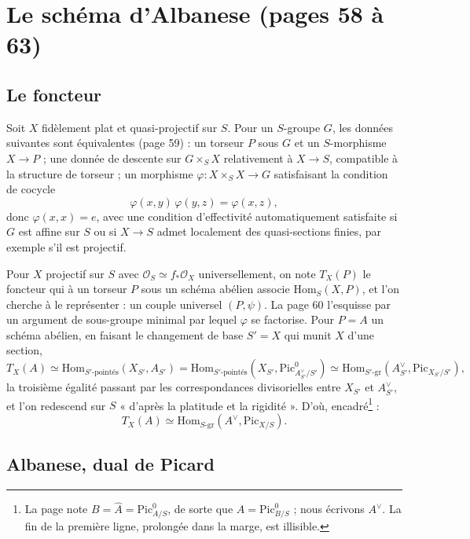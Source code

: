 \documentclass[11pt,a4paper]{article}
\begin{document}
\section*{Le schéma d'Albanese (pages 58 à 63)}

\subsection*{Le foncteur}

Soit $X$ fidèlement plat et quasi-projectif sur $S$. Pour un $S$-groupe $G$,
les données suivantes sont équivalentes (page 59) : un torseur $P$ sous $G$ et
un $S$-morphisme $X \to P$ ; une donnée de descente sur $G \times_S X$
relativement à $X \to S$, compatible à la structure de torseur ; un morphisme
$\varphi \colon X \times_S X \to G$ satisfaisant la condition de cocycle
\[
\varphi(x, y)\,\varphi(y, z) = \varphi(x, z) ,
\]
donc $\varphi(x, x) = e$, avec une condition d'effectivité automatiquement
satisfaite si $G$ est affine sur $S$ ou si $X \to S$ admet localement des
quasi-sections finies, par exemple s'il est projectif.

Pour $X$ projectif sur $S$ avec $\mathcal{O}_S \simeq f_*\mathcal{O}_X$
universellement, on note $T_X(P)$ le foncteur qui à un torseur $P$ sous un
schéma abélien associe $\mathrm{Hom}_S(X, P)$, et l'on cherche à le
représenter : un couple universel $(P, \psi)$. La page 60 l'esquisse par un
argument de sous-groupe minimal par lequel $\varphi$ se factorise. Pour
$P = A$ un schéma abélien, en faisant le changement de base $S' = X$ qui
munit $X$ d'une section,
\[
T_X(A) \simeq \mathrm{Hom}_{S'\text{-pointés}}(X_{S'}, A_{S'})
= \mathrm{Hom}_{S'\text{-pointés}}(X_{S'}, \mathrm{Pic}^0_{A^\vee_{S'}/S'})
\simeq \mathrm{Hom}_{S'\text{-gr}}(A^\vee_{S'}, \mathrm{Pic}_{X_{S'}/S'}) ,
\]
la troisième égalité passant par les correspondances divisorielles entre
$X_{S'}$ et $A^\vee_{S'}$, et l'on redescend sur $S$ « d'après la platitude et
la rigidité ». D'où, encadré\footnote{La page note $B = \hat{A} = \mathrm{Pic}^0_{A/S}$, de
sorte que $A = \mathrm{Pic}^0_{B/S}$ ; nous écrivons $A^\vee$. La fin de la
première ligne, prolongée dans la marge, est illisible.} :
\[
T_X(A) \simeq \mathrm{Hom}_{S\text{-gr}}(A^\vee, \mathrm{Pic}_{X/S}) .
\]

\subsection*{Albanese, dual de Picard}
\end{document}
